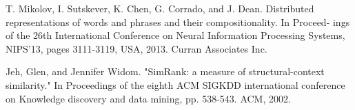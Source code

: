\documentclass[10pt]{article}
\begin{document}
%

\begin{thebibliography}{2}
{}
T. Mikolov, I. Sutskever, K. Chen, G. Corrado, and J. Dean. Distributed
representations of words and phrases and their compositionality. In Proceed-
ings of the 26th International Conference on Neural Information Processing
Systems, NIPS'13, pages 3111-3119, USA, 2013. Curran Associates Inc.
	
Jeh, Glen, and Jennifer Widom. "SimRank: a measure of structural-context similarity." In Proceedings of the eighth ACM SIGKDD international conference on Knowledge discovery and data mining, pp. 538-543. ACM, 2002.

\end{thebibliography}
\end{document}
